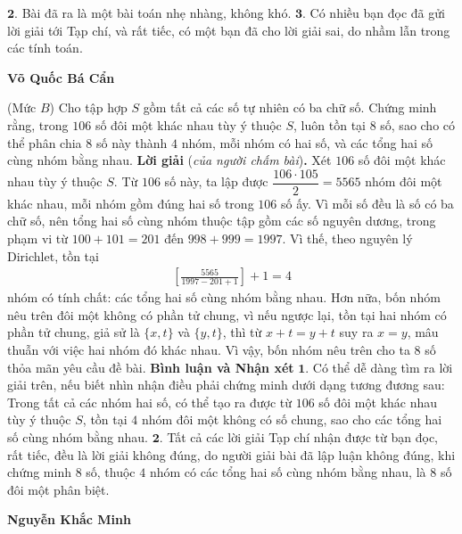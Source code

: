 \begin{multicols}{2}
	\vskip 0.05cm
	$\pmb{2.}$ Bài đã ra là một bài toán nhẹ nhàng, không khó.
	\vskip 0.05cm
	$\pmb{3.}$ Có nhiều bạn đọc đã gửi lời giải tới Tạp chí, và rất tiếc, có một bạn đã cho lời giải sai, do nhầm lẫn trong các tính toán.
	\begin{flushright}
		\textbf{\color{thachthuctoanhoc}Võ Quốc Bá Cẩn}
	\end{flushright}
	{\color{thachthuctoanhoc}{\usefont{T5}{qag}{b}{n} P694.}}
	(Mức $B$) Cho tập hợp $S$ gồm tất cả các số tự nhiên có ba chữ số. Chứng minh rằng, trong $106$ số đôi một khác nhau tùy ý thuộc $S$, luôn tồn tại $8$ số, sao cho có thể phân chia $8$ số này thành $4$ nhóm, mỗi nhóm có hai số, và các tổng hai số cùng nhóm bằng nhau.
	\vskip 0.05cm
	\textbf{\color{thachthuctoanhoc}Lời giải} (\textit{của người chấm bài})\textbf{\color{thachthuctoanhoc}.}
	\vskip 0.05cm
	Xét $106$ số đôi một khác nhau tùy ý thuộc $S$.
	\vskip 0.05cm
	Từ $106$ số này, ta lập được $\dfrac{106 \cdot 105}{2} = 5565$  nhóm đôi một khác nhau, mỗi nhóm gồm đúng hai số trong $106$ số ấy.
	\vskip 0.05cm
	Vì mỗi số đều là số có ba chữ số, nên tổng hai số cùng nhóm thuộc tập gồm các số nguyên dương, trong phạm vi từ $100 + 101 = 201$ đến $998 + 999 = 1997$. Vì thế, theo nguyên lý Dirichlet, tồn tại
	\begin{align*}
		\left[ {\frac{{5565}}{{1997 - 201 + 1}}} \right] + 1 = 4
	\end{align*}
	nhóm có tính chất: các tổng hai số cùng nhóm bằng nhau.
	\vskip 0.05cm
	Hơn nữa, bốn nhóm nêu trên đôi một không có phần tử chung, vì nếu ngược lại, tồn tại hai nhóm có phần tử chung, giả sử là $\{x, t\}$ và $\{y, t\}$, thì từ $x + t = y + t$ suy ra $x = y$, mâu thuẫn với việc hai nhóm đó khác nhau.
	\vskip 0.05cm
	Vì vậy, bốn nhóm nêu trên cho ta 8 số thỏa mãn yêu cầu đề bài.
	\vskip 0.05cm
	\textbf{\color{thachthuctoanhoc}Bình luận và Nhận xét}
	\vskip 0.05cm
	$\pmb{1.}$ Có thể dễ dàng tìm ra lời giải trên, nếu biết nhìn nhận điều phải chứng minh dưới dạng tương đương sau: Trong tất cả các nhóm hai số, có thể tạo ra được từ $106$ số đôi một khác nhau tùy ý thuộc $S$, tồn tại $4$ nhóm đôi một không có số chung, sao cho các tổng hai số cùng nhóm bằng nhau.
	\vskip 0.05cm
	$\pmb{2.}$ Tất cả các lời giải Tạp chí nhận được từ bạn đọc, rất tiếc, đều là lời giải không đúng, do người giải bài đã lập luận không đúng, khi chứng minh $8$ số, thuộc $4$ nhóm có các tổng hai số cùng nhóm bằng nhau, là $8$ số đôi một phân biệt.
	\begin{flushright}
		\textbf{\color{thachthuctoanhoc}Nguyễn Khắc Minh}
	\end{flushright}

\end{multicols}
